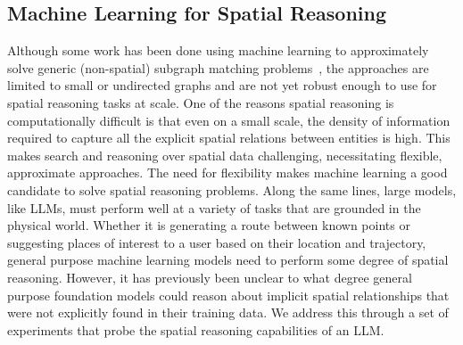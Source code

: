 \subsection{Machine Learning for Spatial Reasoning}
Although some work has been done using machine learning to approximately solve generic (non-spatial) subgraph matching problems~\cite{Krlevza2016, Liu2020Neural,Lan2021,Roy2022}, the approaches are limited to small or undirected graphs and are not yet robust enough to use for spatial reasoning tasks at scale.
One of the reasons spatial reasoning is computationally difficult is that even on a small scale, the density of information required to capture all the explicit spatial relations between entities is high.
This makes search and reasoning over spatial data challenging, necessitating flexible, approximate approaches.
The need for flexibility makes machine learning a good candidate to solve spatial reasoning problems.
Along the same lines, large models, like LLMs, must perform well at a variety of tasks that are grounded in the physical world.
Whether it is generating a route between known points or suggesting places of interest to a user based on their location and trajectory, general purpose machine learning models need to perform some degree of spatial reasoning.
However, it has previously been unclear to what degree general purpose foundation models could reason about implicit spatial relationships that were not explicitly found in their training data.
We address this through a set of experiments that probe the spatial reasoning capabilities of an LLM.






